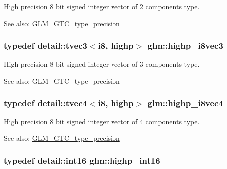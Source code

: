High precision 8 bit signed integer vector of 2 components type. \begin{Desc}
\item[See also:]\hyperlink{group__gtc__type__precision}{GLM\_\-GTC\_\-type\_\-precision} \end{Desc}
\hypertarget{group__gtc__type__precision_gd716792169ce7de963df25b865714438}{
\subsubsection[highp\_\-i8vec3]{\setlength{\rightskip}{0pt plus 5cm}typedef detail::tvec3$<$i8, highp$>$ {\bf glm::highp\_\-i8vec3}}}
\label{group__gtc__type__precision_gd716792169ce7de963df25b865714438}


High precision 8 bit signed integer vector of 3 components type. \begin{Desc}
\item[See also:]\hyperlink{group__gtc__type__precision}{GLM\_\-GTC\_\-type\_\-precision} \end{Desc}
\hypertarget{group__gtc__type__precision_g283b2f580a4bd7207d27418ef4a1068b}{
\subsubsection[highp\_\-i8vec4]{\setlength{\rightskip}{0pt plus 5cm}typedef detail::tvec4$<$i8, highp$>$ {\bf glm::highp\_\-i8vec4}}}
\label{group__gtc__type__precision_g283b2f580a4bd7207d27418ef4a1068b}


High precision 8 bit signed integer vector of 4 components type. \begin{Desc}
\item[See also:]\hyperlink{group__gtc__type__precision}{GLM\_\-GTC\_\-type\_\-precision} \end{Desc}
\hypertarget{group__gtc__type__precision_gf0430ed80e88c0d1dfbe47f359659c81}{
\subsubsection[highp\_\-int16]{\setlength{\rightskip}{0pt plus 5cm}typedef detail::int16 {\bf glm::highp\_\-int16}}}
\label{group__gtc__type__precision_gf0430ed80e88c0d1dfbe47f359659c81}


